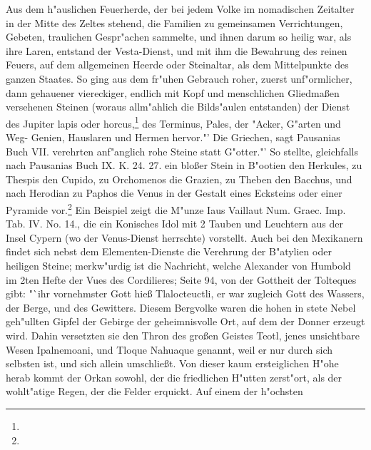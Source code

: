 \documentclass[a4paper, 11pt, oneside, polutonikogreek, german]{article}
\begin{document}
Aus dem h"auslichen Feuerherde, der bei jedem Volke im nomadischen Zeitalter in der Mitte des Zeltes stehend, die Familien zu gemeinsamen Verrichtungen, Gebeten, traulichen Gespr"achen sammelte, und ihnen darum so heilig war, als ihre Laren, entstand der Vesta-Dienst, und mit ihm die Bewahrung des reinen Feuers, auf dem allgemeinen Heerde oder Steinaltar, als dem Mittelpunkte des ganzen Staates. So ging aus dem fr"uhen Gebrauch roher, zuerst unf"ormlicher, dann gehauener viereckiger, endlich mit Kopf und menschlichen Gliedmaßen versehenen Steinen (woraus allm"ahlich die Bilds"aulen entstanden) der Dienst des Jupiter lapis oder horcus,\footnote{} des Terminus, Pales, der "Acker, G"arten und Weg- Genien, Hauslaren und Hermen hervor."' Die Griechen, sagt Pausanias Buch VII. verehrten anf"anglich rohe Steine statt G"otter."' So stellte, gleichfalls nach Pausanias Buch IX. K. 24. 27. ein bloßer Stein in B"ootien den Herkules, zu Thespis den Cupido, zu Orchomenos die Grazien, zu Theben den Bacchus, und nach Herodian zu Paphos die Venus in der Gestalt eines Ecksteins oder einer Pyramide vor.\footnote{} Ein Beispiel zeigt die M"unze Iaus Vaillaut Num. Graec. Imp. Tab. IV. No. 14., die ein Konisches Idol mit 2 Tauben und Leuchtern aus der Insel Cypern (wo der Venus-Dienst herrschte) vorstellt. Auch bei den Mexikanern findet sich nebst dem Elementen-Dienste die Verehrung der B"atylien oder heiligen Steine; merkw"urdig ist die Nachricht, welche Alexander von Humbold im 2ten Hefte der Vues des Cordilieres; Seite 94, von der Gottheit der Tolteques gibt: "`ihr vornehmster Gott hieß Tlalocteuctli, er war zugleich Gott des Wassers, der Berge, und des Gewitters. Diesem Bergvolke waren die hohen in stete Nebel geh"ullten Gipfel der Gebirge der geheimnisvolle Ort, auf dem der Donner erzeugt wird. Dahin versetzten sie den Thron des großen Geistes Teotl, jenes unsichtbare Wesen Ipalnemoani, und Tloque Nahuaque genannt, weil er nur durch sich selbsten ist, und sich allein umschließt. Von dieser kaum ersteiglichen H"ohe herab kommt der Orkan sowohl, der die friedlichen H"utten zerst"ort, als der wohlt"atige Regen, der die Felder erquickt. Auf einem der h"ochsten 
\end{document}
